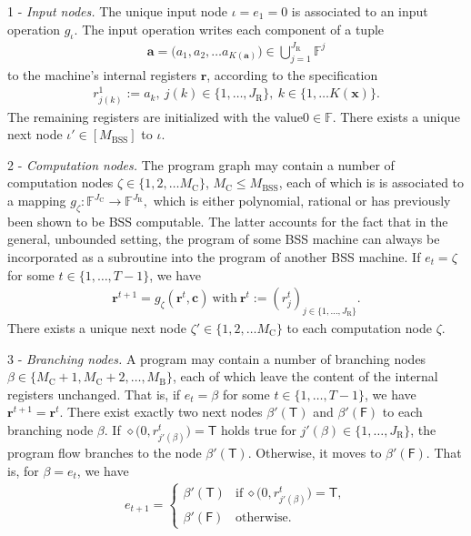 \documentclass[conference]{IEEEtran}
\def\FF{{\mathbb F}}
\newcommand{\BSS}{\mathrm{BSS}}
\begin{document}
	1 - \emph{Input nodes.} The unique input node \(\iota = e_1 = 0\) is associated to an 
		input operation \(g_\iota\). The input operation writes each component of a tuple 
		\begin{align*} 	\bm{a} = \big(a_1,a_2,\ldots a_{K({\bm{a}})}\big) \in {\bigcup}_{j=1}^{J_{\mathrm{R}}} \FF^{j}
		\end{align*}
		to the machine's internal registers \(\bm{r}\), according to the specification
		\begin{align*}	r^1_{j(k)} := a_k ,~ j(k)\in \{1,\ldots,J_{\mathrm{R}}\},~ k\in \{1,\ldots K(\bm{x})\}.   
		\end{align*}
		The remaining registers are initialized with the value\linebreak \(0 \in \FF\).
		There exists a unique next node \(\iota' \in [M_\BSS]\) to \(\iota\).
	
	2 - \emph{Computation nodes.} The program graph may contain a number of computation nodes \(\zeta \in \{1,2,\ldots M_{\mathrm{C}}\}\),    
		\linebreak \(M_{\mathrm{C}} \leq M_{\BSS}\), each of which is 
		is associated to a mapping 
		\( 	g_\zeta : \FF^{J_{\mathrm{C}}}\rightarrow \FF^{J_{\mathrm{R}}}, 
		\) 
		which is either polynomial, rational or has previously been shown to be BSS computable. The latter accounts for the fact that in the general, 
		unbounded setting, the program of some BSS machine can always be incorporated as a subroutine into the program of another BSS machine.
		If \(e_t = \zeta\) for some \(t\in\{1,\ldots, T-1\}\), we have
		\begin{align*}  \bm{r}^{t+1} = g_{\zeta}(\bm{r}^t,\bm{c})~\text{with}~\bm{r}^t := (r_j^t)_{j\in\{1,\ldots,J_{\mathrm{R}}\}}.
		\end{align*}
		There exists a unique next node \(\zeta' \in \{1,2,\ldots M_{\mathrm{C}}\}\) to each computation node \(\zeta\).
	
	3 - \emph{Branching nodes.}  A program may contain a number of branching nodes \(\beta \in \{M_{\mathrm{C}} + 1, M_{\mathrm{C}} + 2,\ldots, M_\mathrm{B}\}\), 
		each of which leave the content of the internal registers unchanged. That is, if \(e_t = \beta\) for some \(t\in\{1,\ldots, T-1\}\), we have
		\(\bm{r}^{t+1} = \bm{r}^{t}\). There exist exactly two next nodes \(\beta'(\mathsf{T})\) and \(\beta'(\mathsf{F})\) to each branching node \(\beta\). If 
		\(	\diamond\big(0, r^t_{j'(\beta)}\big) = \mathsf{T} 
		\)
		holds true for \(j'(\beta) \in \{1,\ldots, J_\mathrm{R}\}\), the program flow branches to the node \(\beta'(\mathsf{T})\). Otherwise, it moves to \(\beta'(\mathsf{F})\). 
		That is, for \(\beta = e_t\), we have
		\begin{align*}   e_{t+1} =   \begin{cases}   \beta'(\mathsf{T})  &\text{if}~\diamond\big(0,r^t_{j'(\beta)}\big) = \mathsf{T},\\
													\beta'(\mathsf{F})  &\text{otherwise}.
									\end{cases}    
		\end{align*}
		
\end{document}
